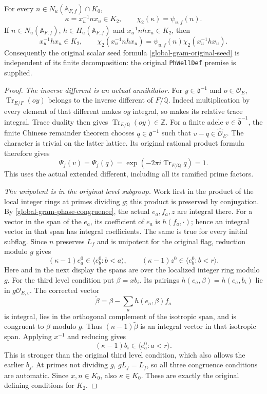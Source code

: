 \begin{theorem}
\label{global-gram-phase-match}
For every $n\in N_u(\mathbb A_{F,f})\cap K_0$,
\[
 \kappa=x_u^{-1}nx_u\in K_2,
 \qquad \chi_2(\kappa)=\psi_{u,f}(n).
\]
If $n\in N_u(\mathbb A_{F,f})$, $h\in H_u(\mathbb A_{F,f})$
and $x_u^{-1}nhx_u\in K_2$, then
\[
 x_u^{-1}hx_u\in K_2,\qquad
 \chi_2(x_u^{-1}nhx_u)
       =\psi_{u,f}(n)\chi_2(x_u^{-1}hx_u).
\]
Consequently the original scalar seed formula
\eqref{global-gram-original-seed} is independent of its finite
decomposition: the original \texttt{PhWellDef} premise is supplied.
\end{theorem}

\begin{proof}
\emph{The inverse different is an actual annihilator.}
For $y\in\mathfrak d^{-1}$ and $o\in\mathcal O_E$,
$\operatorname{Tr}_{E/F}(oy)$ belongs to the inverse different
of $F/\mathbb Q$.  Indeed multiplication by every element of
that different makes $oy$ integral, so makes its relative trace
integral.  Trace duality then gives
$\operatorname{Tr}_{E/\mathbb Q}(oy)\in\mathbb Z$.
For a finite adele $v\in\widehat{\mathfrak d}^{-1}$, the finite
Chinese remainder theorem chooses $q\in\mathfrak d^{-1}$ such
that $v-q\in\widehat{\mathcal O}_E$.  The character is trivial
on the latter lattice.  Its original rational product formula
therefore gives
\[
 \Psi_f(v)=\Psi_f(q)
          =\exp(-2\pi i\operatorname{Tr}_{E/\mathbb Q}q)=1.
\]
This uses the actual extended different, including all its
ramified prime factors.

\emph{The unipotent is in the original level subgroup.}
Work first in the product of the local integer rings at primes
dividing $g$; this product is preserved by conjugation.  By
\eqref{global-gram-phase-congruence}, the actual $e_a,f_a,z$
are integral there.  For a vector in the span of the $e_a$,
its coefficient of $e_a$ is $h(f_a,\cdot)$; hence an integral
vector in that span has integral coefficients.  The same is
true for every initial subflag.  Since $n$ preserves $L_f$ and
is unipotent for the original flag, reduction modulo $g$ gives
\[
 (\kappa-1)e_a^0\in\langle e_b^0:b<a\rangle,
 \qquad (\kappa-1)z^0\in\langle e_b^0:b<r\rangle.
\]
Here and in the next display the spans are over the localized
integer ring modulo $g$.  For the third level condition put
$\beta=xb_i$.  Its pairings $h(e_a,\beta)=h(e_a,b_i)$ lie
in $g\mathcal O_{E,v}$.  The corrected vector
\[
          \widetilde\beta=\beta-\sum_a h(e_a,\beta)f_a
\]
is integral, lies in the orthogonal complement of the isotropic
span, and is congruent to $\beta$ modulo $g$.  Thus
$(n-1)\widetilde\beta$ is an integral vector in that isotropic
span.  Applying $x^{-1}$ and reducing gives
\[
               (\kappa-1)b_i\in\langle e_a^0:a<r\rangle.
\]
This is stronger than the original third level condition, which
also allows the earlier $b_j$.  At primes not dividing $g$,
$gL_f=L_f$, so all three congruence conditions are automatic.
Since $x,n\in K_0$, also $\kappa\in K_0$.  These are exactly
the original defining conditions for $K_2$.


\end{proof}
